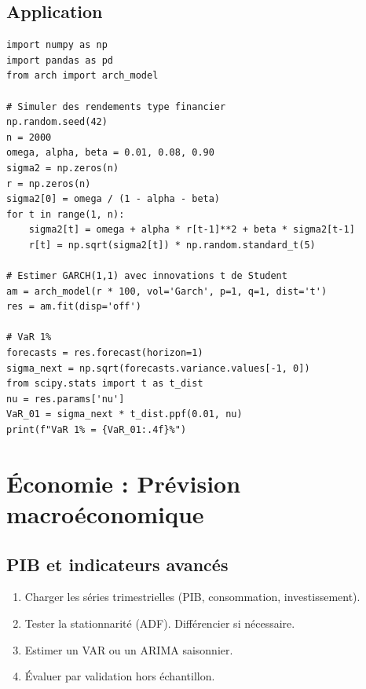\subsection{Application}

\begin{codeblock}[title=\textbf{Python --- VaR avec GARCH}]
\begin{verbatim}
import numpy as np
import pandas as pd
from arch import arch_model

# Simuler des rendements type financier
np.random.seed(42)
n = 2000
omega, alpha, beta = 0.01, 0.08, 0.90
sigma2 = np.zeros(n)
r = np.zeros(n)
sigma2[0] = omega / (1 - alpha - beta)
for t in range(1, n):
    sigma2[t] = omega + alpha * r[t-1]**2 + beta * sigma2[t-1]
    r[t] = np.sqrt(sigma2[t]) * np.random.standard_t(5)

# Estimer GARCH(1,1) avec innovations t de Student
am = arch_model(r * 100, vol='Garch', p=1, q=1, dist='t')
res = am.fit(disp='off')

# VaR 1%
forecasts = res.forecast(horizon=1)
sigma_next = np.sqrt(forecasts.variance.values[-1, 0])
from scipy.stats import t as t_dist
nu = res.params['nu']
VaR_01 = sigma_next * t_dist.ppf(0.01, nu)
print(f"VaR 1% = {VaR_01:.4f}%")
\end{verbatim}
\end{codeblock}

\section{\'Economie : Pr\'evision macro\'economique}

\subsection{PIB et indicateurs avanc\'es}

\begin{methode}
\begin{enumerate}
\item Charger les s\'eries trimestrielles (PIB, consommation, investissement).
\item Tester la stationnarit\'e (ADF). Diff\'erencier si n\'ecessaire.
\item Estimer un VAR ou un ARIMA saisonnier.
\item \'Evaluer par validation hors \'echantillon.
\end{enumerate}
\end{methode}

